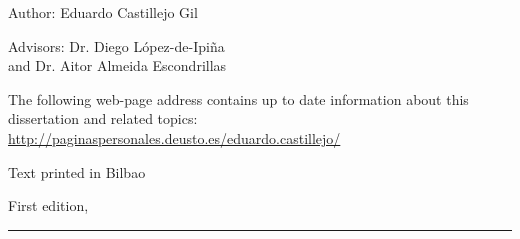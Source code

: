 
\thispagestyle{empty}

\hfill

\vfill

\medskip






Author: Eduardo Castillejo Gil

Advisors: Dr. Diego {López-de-Ipiña} \\
and Dr. Aitor Almeida Escondrillas



\vfill

\vfill

\noindent
The following web-page address contains up to date information about this 
dissertation and related topics: \\
\url{http://paginaspersonales.deusto.es/eduardo.castillejo/}


\noindent
Text printed in Bilbao

\noindent
First edition, 
\monthname \ \the\year

\vspace{1cm}
\hrule
\bigskip

\cleardoublepage

%
%
%
%
%
%

